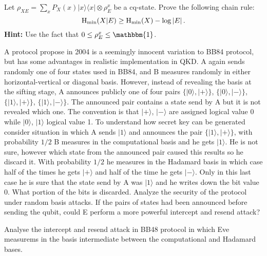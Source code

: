 \documentclass[a4paper,10pt,landscape,twocolumn]{scrartcl}
\newcommand{\ket}[1]{| #1 \rangle}
\newcommand{\bra}[1]{\langle #1 |}
\begin{document}
\begin{exercise}
Let $\rho_{XE} = \sum_x P_X(x) \ket{x}\bra{x} \otimes \rho_E^x$ be a cq-state. Prove the following chain rule:
\[
\mathrm{H}_{\mathrm{min}}(X | E) \geq \mathrm{H}_{\mathrm{min}}(X) - \log |E| \, .
\]
\textbf{Hint: } Use the fact that $0 \leq \rho_E^x \leq \mathbbm{1}$.

\end{exercise}

\begin{exercise}
A protocol propose in 2004 is a seemingly innocent variation to BB84 protocol, but has some advantages in realistic implementation
in QKD. A again sends randomly one of four states used in BB84, and B measures randomly in either horizontal-vertical or diagonal basis. However, instead of revealing the basis at the sifting stage, A announces publicly one of four pairs $\{ \ket{0},\ket{+} \}$, $\{ \ket{0},\ket{-} \}$, $\{ \ket{1},\ket{+} \}$, $\{ \ket{1},\ket{-} \}$. The announced pair contains a state send by A but it is not revealed which one. The convention is that $\ket{+}$, $\ket{-}$ are assigned logical value 0 while $\ket{0}$, $\ket{1}$ logical value 1. To understand how secret key can be generated consider situation in which A sends $\ket{1}$ and announces the pair $\{ \ket{1},\ket{+} \}$, with
probability $1/2$ B measures in the computational basis and he gets $\ket{1}$. He is not sure, however which state from the announced pair caused this results so he discard it. With probability $1/2$ he measures in the Hadamard basis in which case half of the times he gets $\ket{+}$ and half of the time he gets $\ket{-}$. Only in this last case he is sure that the state send by A was $\ket{1}$ and he writes down the bit value 0. What portion of the bits is discarded. Analyze the security of the protocol under random basis attacks. If the pairs of states had been announced before sending the qubit, could E perform a more powerful intercept and resend attack?
\end{exercise}

\begin{exercise}
Analyse the intercept and resend attack in BB48 protocol in which Eve measurems in the basis intermediate between the computational and Hadamard bases.
\end{exercise}
\end{document}
